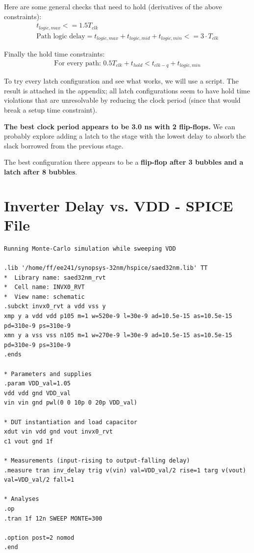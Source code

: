 \documentclass[11pt]{article}
\begin{document}
Here are some general checks that need to hold (derivatives of the above constraints):
\begin{eqnarray}
	t_{logic,max} <= 1.5 T_{clk} \\
	\text{Path logic delay} = t_{logic,max} + t_{logic,mid} + t_{logic,min} <= 3 \cdot T_{clk}
\end{eqnarray}

Finally the hold time constraints:
\begin{eqnarray}
	\text{For every path: } 0.5 T_{clk} + t_{hold} < t_{clk-q} + t_{logic,min}
\end{eqnarray}

To try every latch configuration and see what works, we will use a script. The result is attached in the appendix; all latch configurations seem to have hold time violations that are unresolvable by reducing the clock period (since that would break a setup time constraint).

\textbf{The best clock period appears to be 3.0 ns with 2 flip-flops.} We can probably explore adding a latch to the stage with the lowest delay to absorb the slack borrowed from the previous stage.

The best configuration there appears to be a \textbf{flip-flop after 3 bubbles and a latch after 8 bubbles}.
\newpage
\appendix

\section{Inverter Delay vs. VDD - SPICE File}
\begin{verbatim}
Running Monte-Carlo simulation while sweeping VDD

.lib '/home/ff/ee241/synopsys-32nm/hspice/saed32nm.lib' TT
*  Library name: saed32nm_rvt
*  Cell name: INVX0_RVT
*  View name: schematic
.subckt invx0_rvt a vdd vss y
xmp y a vdd vdd p105 m=1 w=520e-9 l=30e-9 ad=10.5e-15 as=10.5e-15 pd=310e-9 ps=310e-9
xmn y a vss vss n105 m=1 w=270e-9 l=30e-9 ad=10.5e-15 as=10.5e-15 pd=310e-9 ps=310e-9
.ends 

* Parameters and supplies
.param VDD_val=1.05
vdd vdd gnd VDD_val
vin vin gnd pwl(0 0 10p 0 20p VDD_val)

* DUT instantiation and load capacitor
xdut vin vdd gnd vout invx0_rvt
c1 vout gnd 1f

* Measurements (input-rising to output-falling delay)
.measure tran inv_delay trig v(vin) val=VDD_val/2 rise=1 targ v(vout) val=VDD_val/2 fall=1

* Analyses
.op
.tran 1f 12n SWEEP MONTE=300

.option post=2 nomod
.end
\end{verbatim}
\end{document}
